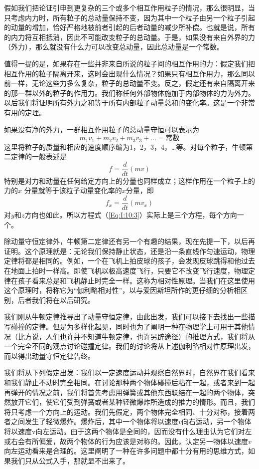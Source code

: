 假如我们把论证引申到更复杂的三个或多个相互作用粒子的情况，那么很明显，当只考虑内力时，所有粒子的总动量保持不变，因为其中一个粒子由另一个粒子引起的动量的增加，恰好严格地被前者引起的后者动量的减少所补偿。也就是说，所有的内力将互相抵消，因此不可能改变粒子的总动量。于是，如果没有来自外界的力（外力），那么就没有什么力可以改变总动量，因此总动量是一个常数。

值得一提的是，如果存在一些并非来自所说的粒子间的相互作用的力：假定我们把相互作用的粒子隔离开来，这时会出现什么情况？如果只有相互作用力，那么同以前一样，无论这些力多么复杂，粒子的总动量不变。反之，假定还有来自隔离开来的那一群以外的粒子的作用力。我们称任何外部物体施加于内部物体的力为外力。以后我们将证明所有外力之和等于所有内部粒子动量总和的变化率。这是一个非常有用的定理。

如果没有净的外力，一群相互作用粒子的总动量守恒可以表示为
\begin{equation}
    \label{Eq:I:10:3}
    m_1v_1+m_2v_2+m_3v_3+...=\text{常数}
\end{equation}
这里将粒子的质量和相应的速度顺序编为1，2，3，4，…等。对每个粒子，牛顿第二定律的一般表述是
\begin{equation}
    \label{Eq:I:10:4}
    f=\frac{d}{dt}(mv)
\end{equation}
特别是对力和动量在任何给定方向上的分量也同样成立；这样作用在一个粒子上的力的$x$
分量就等于该粒子动量变化率的$x$分量，即
\begin{equation}
    \label{Eq:I:10:5}
    f_x=\frac{d}{dt}(mv_x)
\end{equation}
对$y$和$z$方向也如此。所以方程式（\ref{Eq:I:10:3}）实际上是三个方程，每个方向一个。

除动量守恒定律外，牛顿第二定律还有另一个有趣的结果，现在先提一下，以后再证明。这个原理就是：无论我们保持静止状态，还是沿一条直线作匀速运动，物理定律将都是相同的。例如，一个在飞机上拍皮球的孩子，会发现皮球跳得和他过去在地面上拍时一样高。即使飞机以极高速度飞行，只要它不改变飞行速度，物理定律在孩子看来总是和飞机静止时完全一样。这称为相对性原理。当我们在这里使用这个原理时，将称它为“伽利略相对性”，以与爱因斯坦所作的更仔细的分析相区别，后者我们将在以后研究。

我们刚从牛顿定律推导出了动量守恒定律，由此出发，我们可以接下去找出一些描写碰撞的定律。但是为多样化起见，同时也为了阐明一种在物理学上可用于其他情况（比方说，人们也许并不知道牛顿定律，也许另辟途径）的推理方式，我们将从一个完全不同的观点讨论碰撞定律。我们的讨论将从上述伽利略相对性原理出发，而以得出动量守恒定律告终。

我们将从下列假定出发：我们以一定速度运动并观察自然界时，自然界在我们看来和我们静止不动时完全相同。在讨论那种两个物体碰撞后粘在一起，或者来到一起再弹开的情况之前，我们将首先考虑用弹簧或其他东西联结在一起的两个物体，突然放开它们，使它们受到弹簧或者某种轻微爆炸所造成的推力的情形。而且，我们将只考虑一个方向上的运动。我们先假定，两个物体完全相同、十分对称，接着两者之间发生了轻微爆炸。爆炸后，其中一个物体将以速度$v$向右运动，另一个物体将以速度v向左运动。由于这两个物体是全同的，因而没有什么理由认为它们对左或右会有所偏爱，故两个物体的行为应该是对称的。因此，认定另一物体以速度$v$向左运动看来是合理的。这里阐明了一种在许多问题中都十分有用的思维方式，如果我们只从公式入手，那就显不出来了。

